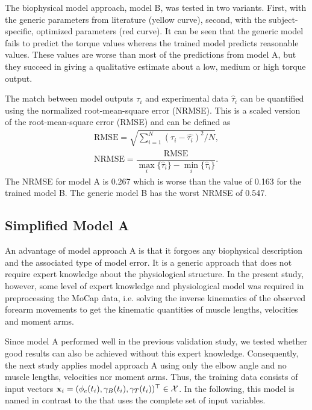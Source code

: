 The biophysical model approach, model B, was tested in two variants. First, with the generic parameters from literature (yellow curve), second, with the subject-specific, optimized parameters (red curve). It can be seen that the generic model fails to predict the torque values whereas the trained model predicts reasonable values. These values are worse than most of the predictions from model A, but they succeed in giving a qualitative estimate about a low, medium or high torque output.

The match between model outputs $\tau_i$ and experimental data $\hat\tau_i$ can be quantified using the normalized root-mean-square error (NRMSE). This is a scaled version of the root-mean-square error (RMSE) and can be defined as
\begin{equation*}
  \begin{array}{lll}
    \text{RMSE} = \sqrt{\sum\limits_{i=1}^N (\tau_i - \hat{\tau_i})^2 / N},\\[4mm]
    \text{NRMSE} = \dfrac{\text{RMSE}}{\max\limits_i\{\hat\tau_i\} - \min\limits_i\{\hat\tau_i\}}.
  \end{array}
\end{equation*}
The NRMSE for model A is 0.267 which is worse than the value of 0.163 for the trained model B. The generic model B has the worst NRMSE of 0.547.

\subsection{Simplified Model A}\label{sec:res_simplified_a}
An advantage of model approach A is that it forgoes any biophysical description and the associated type of model error. It is a generic approach that does not require expert knowledge about the physiological structure. In the present study, however, some level of expert knowledge and physiological model was required in preprocessing the MoCap data, i.e. solving the inverse kinematics of the observed forearm movements to get the kinematic quantities of muscle lengths, velocities and moment arms. 

Since model A performed well in the previous validation study, we tested whether good results can also be achieved without this expert knowledge.
Consequently, the next study applies model approach A using only the elbow angle and no muscle lengths, velocities nor moment arms. Thus, the training data consists of input vectors $\textbf{x}_i = (\phi_e(t_i), \gamma_B(t_i), \gamma_T(t_i))^\top \in \mathcal{X}$. In the following, this model is named  in contrast to the  that uses the complete set of input variables.

